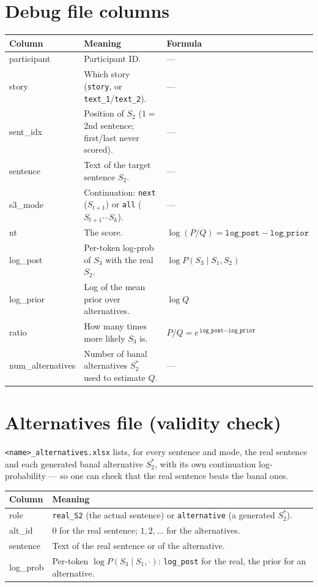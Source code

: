 \documentclass[11pt]{article}
\newcommand{\col}[1]{\texttt{#1}}
\begin{document}
\section*{Debug file columns}
\begin{center}
\begin{tabular}{@{}>{\ttfamily}l l l@{}}
\toprule
\normalfont\textbf{Column} & \textbf{Meaning} & \textbf{Formula} \\
\midrule
participant & Participant ID. & --- \\
story       & Which story (\col{story}, or \col{text\_1}/\col{text\_2}). & --- \\
sent\_idx   & Position of $S_2$ ($1=$ 2nd sentence; first/last never scored). & --- \\
sentence    & Text of the target sentence $S_2$. & --- \\
s3\_mode    & Continuation: \col{next} ($S_{t+1}$) or \col{all} ($S_{t+1}\cdots S_k$). & --- \\
nt          & The score. & $\log(P/Q)=\col{log\_post}-\col{log\_prior}$ \\
log\_post   & Per-token log-prob of $S_3$ with the real $S_2$. & $\log P(S_3\mid S_1,S_2)$ \\
log\_prior  & Log of the mean prior over alternatives. & $\log Q$ \\
ratio       & How many times more likely $S_3$ is. & $P/Q=e^{\,\col{log\_post}-\col{log\_prior}}$ \\
num\_alternatives & Number of banal alternatives $S_2^{*}$ used to estimate $Q$. & --- \\
\bottomrule
\end{tabular}
\end{center}

\section*{Alternatives file (validity check)}
\col{<name>\_alternatives.xlsx} lists, for every sentence and mode, the real
sentence and each generated banal alternative $S_2^{*}$, with its own
continuation log-probability --- so one can check that the real sentence beats
the banal ones.
\begin{center}
\begin{tabular}{@{}>{\ttfamily}l l@{}}
\toprule
\normalfont\textbf{Column} & \textbf{Meaning} \\
\midrule
role     & \col{real\_S2} (the actual sentence) or \col{alternative} (a generated $S_2^{*}$). \\
alt\_id  & $0$ for the real sentence; $1,2,\dots$ for the alternatives. \\
sentence & Text of the real sentence or of the alternative. \\
log\_prob & Per-token $\log P(S_3\mid S_1,\cdot)$: \col{log\_post} for the real, the prior for an alternative. \\
\bottomrule
\end{tabular}
\end{center}
\end{document}
